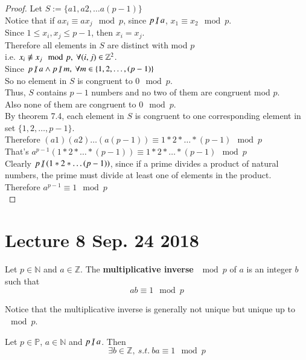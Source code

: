 \documentclass[10pt]{article}
\begin{document}
	\begin{proof}
		Let $S := \{a1, a2, \dots a(p-1)\}$ \\
		Notice that if $ax_i \equiv ax_j \mod p$, since $p \centernot | a$, $x_1 \equiv x_2 \mod p$. \\
		Since $1 \leq x_i, x_j \leq p-1$, then $x_i = x_j$. \\
		Therefore all elements in $S$ are distinct with mod $p$ \\
		i.e. $x_i \centernot \equiv x_j \mod p,\ \forall (i,j) \in \mathbb{Z}^2$. \\
		Since $p \centernot | a \land p \centernot | m,\ \forall m \in \{1, 2, \dots, (p-1)\}$ \\
		So no element in $S$ is congruent to $0 \mod p$. \\
		Thus, $S$ contains $p-1$ numbers and no two of them are congruent mod $p$. \\
		Also none of them are congruent to $0 \mod p$. \\
		By theorem 7.4, each element in $S$ is congruent to one corresponding element in set $\{1,2,\dots, p-1\}$. \\
		Therefore $(a1)(a2)\dots(a(p-1)) \equiv 1*2*\dots*(p-1) \mod p$ \\
		That's $a^{p-1}(1*2* \dots *(p-1)) \equiv 1*2*\dots*(p-1) \mod p$ \\
		Clearly $p \centernot | (1*2*\dots (p-1))$, since if a prime divides a product of natural numbers, the prime must divide at least one of elements in the product. \\
		Therefore $a^{p-1} \equiv 1 \mod p$ \\
	\end{proof}
	
	\section{Lecture 8 Sep. 24 2018}
	\begin{definition}
		Let $p \in \mathbb{N}$ and $a \in \mathbb{Z}$. The \textbf{multiplicative inverse} $\mod p$ of $a$ is an integer $b$ such that
		\[
			ab \equiv 1 \mod p
		\]
	\end{definition}
	\begin{remark}
		Notice that the multiplicative inverse is generally not unique but unique up to $\mod p$.		
	\end{remark}
	
	\begin{corollary}
		Let $p \in \mathbb{P}$, $a \in \mathbb{N}$ and $p \centernot | a$. Then 
		\[
			\exists b \in \mathbb{Z},\ s.t.\ ba \equiv 1 \mod p
		\]
	\end{corollary}
	
\end{document}
